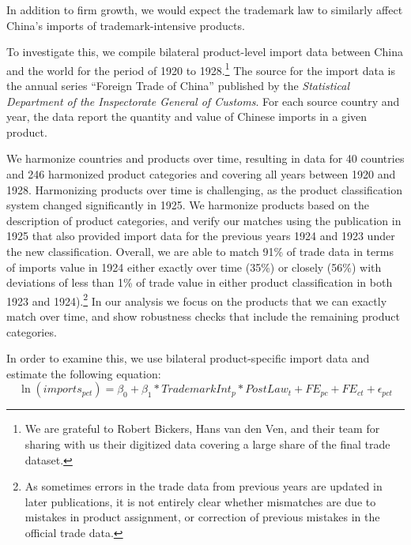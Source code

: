 \documentclass[12pt]{article}
\begin{document}
In addition to firm growth, we would expect the trademark law to similarly affect China's imports of trademark-intensive products. 

To investigate this, we compile bilateral product-level import data between China and the world for the period of 1920 to 1928.\footnote{We are grateful to Robert Bickers, Hans van den Ven, and their team for sharing with us their digitized data covering a large share of the final trade dataset.} The source for the import data  is the annual series ``Foreign Trade of China'' published by the \emph{Statistical Department of the Inspectorate General of Customs}. For each source country  and year, the data report the quantity and value of Chinese imports in a given product.

We harmonize countries and products over time, resulting in data for 40 countries and 246 harmonized product categories and covering all years between 1920 and 1928. Harmonizing products over time is challenging, as the product classification system changed significantly in 1925. We harmonize products based on the description of product categories, and verify our matches using the publication in 1925 that also provided import data for the previous years 1924 and 1923 under the new classification. Overall, we are able to match 91\% of trade data in terms of imports value in 1924 either exactly over time (35\%) or closely (56\%) with deviations of less than 1\% of trade value in either product classification in both 1923 and 1924).\footnote{As sometimes errors in the trade data from previous years are updated in later publications, it is not entirely clear whether mismatches are due to mistakes in product assignment, or correction of previous mistakes in the official trade data.}  In our analysis we focus on the products that we can exactly match over time, and show robustness checks that include the remaining product categories.


In order to examine this, we use bilateral product-specific import data and estimate the following equation:
\begin{equation} \label{eqn:imports_regression}
    \ln (imports_{pct}) = \beta_0 + \beta_1*TrademarkInt_{p}*PostLaw_t + FE_{pc} + FE_{ct} + \epsilon_{pct} 
\end{equation}
\end{document}
